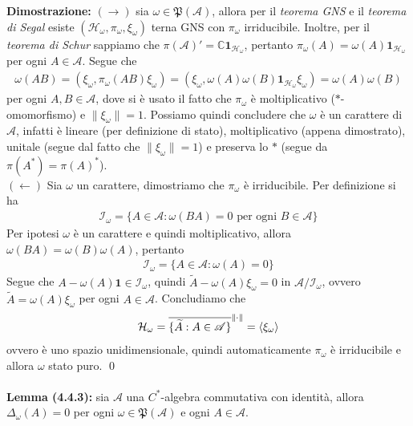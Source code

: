 \documentclass{article}
\numberwithin{equation}{subsection}
\begin{document}
\textbf{Dimostrazione:} $(\rightarrow)$ sia $\omega \in \mathfrak{P}(\mathscr{A})$, allora per il \textit{teorema GNS} e il \textit{teorema di Segal} esiste $(\mathcal{H}_\omega, \pi_\omega, \xi_\omega)$ terna GNS con $\pi_\omega$ irriducibile. Inoltre, per il \textit{teorema di Schur} sappiamo che $\pi(\mathscr{A})' = \mathbb{C}\mathbf{1}_{\mathcal{H}_\omega}$, pertanto $\pi_\omega(A) = \omega(A)\mathbf{1}_{\mathcal{H}_\omega}$ per ogni $A \in \mathscr{A}$. Segue che
\begin{align*}
    \omega(AB) = (\xi_\omega, \pi_\omega(AB)\xi_\omega) = (\xi_\omega, \omega(A)\omega(B)\mathbf{1}_{\mathcal{H}_\omega}\xi_\omega) = \omega(A)\omega(B)
\end{align*}
per ogni $A, B \in \mathscr{A}$, dove si è usato il fatto che $\pi_\omega$ è moltiplicativo ($*$-omomorfismo) e $\|\xi_\omega\| = 1$. Possiamo quindi concludere che $\omega$ è un carattere di $\mathscr{A}$, infatti è lineare (per definizione di stato), moltiplicativo (appena dimostrato), unitale (segue dal fatto che $\|\xi_\omega\| = 1$) e preserva lo $*$ (segue da $\pi(A^*) = \pi(A)^*$). \\
$(\leftarrow)$ Sia $\omega$ un carattere, dimostriamo che $\pi_\omega$ è irriducibile. Per definizione si ha
\begin{align*}
    \mathscr{I}_\omega = \{A \in \mathscr{A} : \omega(BA) = 0 \text{ per ogni } B \in \mathscr{A}\}
\end{align*}
Per ipotesi $\omega$ è un carattere e quindi moltiplicativo, allora $\omega(BA) = \omega(B)\omega(A)$, pertanto
\begin{align*}
    \mathscr{I}_\omega = \{A \in \mathscr{A} : \omega(A) = 0\}
\end{align*}
Segue che $A - \omega(A)\mathbf{1} \in \mathscr{I}_\omega$, quindi $\widetilde{A} - \omega(A)\xi_\omega = 0$ in $\mathscr{A}/\mathscr{I}_\omega$, ovvero $\widetilde{A} = \omega(A)\xi_\omega$ per ogni $A \in \mathscr{A}$. Concludiamo che
\begin{align*}
    \mathcal{H}_\omega = \overline{\{\widetilde{A} : A \in \mathscr{A}\}}^{\|\cdot\|} = \braket{\xi_\omega}
\end{align*}
ovvero è uno spazio unidimensionale, quindi automaticamente $\pi_\omega$ è irriducibile e allora $\omega$ stato puro. \qed \\ \\
\textbf{Lemma (4.4.3):} sia $\mathscr{A}$ una $C^*$-algebra commutativa con identità, allora $\Delta_\omega(A) = 0$ per ogni $\omega \in \mathfrak{P}(\mathscr{A})$ e ogni $A \in \mathscr{A}$. \\
\end{document}
